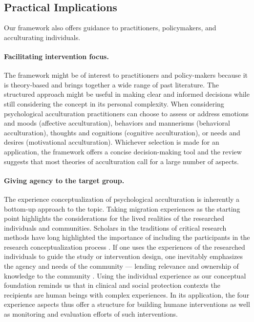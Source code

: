 \documentclass[man, 12pt, a4paper, mask]{apa7}
\begin{document}
\subsection{Practical Implications}
Our framework also offers guidance to practitioners, policymakers, and acculturating individuals. 

\paragraph{Facilitating intervention focus.} The framework might be of interest to practitioners and policy-makers because it is theory-based and brings together a wide range of past literature. The structured approach might be useful in making clear and informed decisions while still considering the concept in its personal complexity. When considering psychological acculturation practitioners can choose to assess or address emotions and moods (affective acculturation), behaviors and mannerisms (behavioral acculturation), thoughts and cognitions (cognitive acculturation), or needs and desires (motivational acculturation). Whichever selection is made for an application, the framework offers a concise decision-making tool and the review suggests that most theories of acculturation call for a large number of aspects.

\paragraph{Giving agency to the target group.} The experience conceptualization of psychological acculturation is inherently a bottom-up approach to the topic. Taking migration experiences as the starting point highlights the considerations for the lived realities of the researched individuals and communities. Scholars in the traditions of critical research methods have long highlighted the importance of including the participants in the research conceptualization process \citep[e.g.,][]{Kovach2009}. If one uses the experiences of the researched individuals to guide the study or intervention design, one inevitably emphasizes the agency and needs of the community --- lending relevance and ownership of knowledge to the community \citep[e.g., ][]{Schmidt2021}. Using the individual experience as our conceptual foundation reminds us that in clinical and social protection contexts the recipients are human beings with complex experiences. In its application, the four experience aspects thus offer a structure for building humane interventions as well as monitoring and evaluation efforts of such interventions. 
\end{document}
